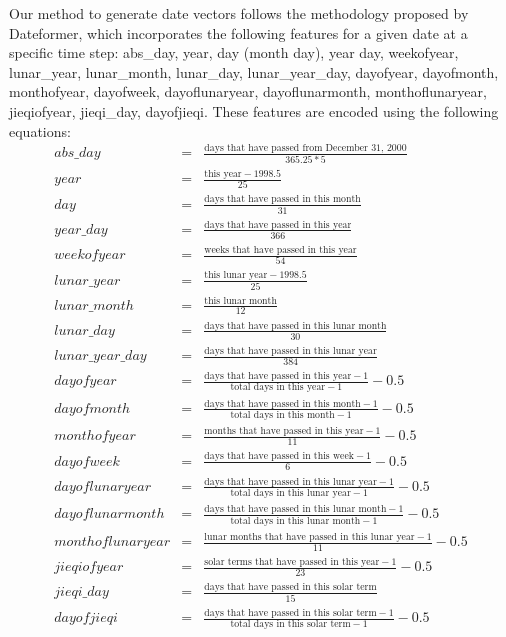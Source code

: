 \documentclass{article}
\begin{document}
Our method to generate date vectors follows the methodology proposed by Dateformer\cite{dateformer}, which incorporates the following features for a given date at a specific time step: abs\_day, year, day (month day), year day, weekofyear, lunar\_year, lunar\_month, lunar\_day, lunar\_year\_day, dayofyear, dayofmonth, monthofyear, dayofweek, dayoflunaryear, dayoflunarmonth, monthoflunaryear, jieqiofyear, jieqi\_day, dayofjieqi. These features are encoded using the following equations:
\begin{eqnarray}
    abs\_day &=& \frac{\text{days that have passed from December 31, 2000}}{365.25*5} \nonumber \\
    year &=& \frac{\text{this year} - 1998.5}{25} \nonumber \\
    day &=& \frac{\text{days that have passed in this month}}{31}\nonumber \\
    year\_day &=& \frac{\text{days that have passed in this year}}{366} \nonumber \\
    weekofyear&=& \frac{\text{weeks that have passed in this year}}{54} \nonumber \\
    lunar\_year&=& \frac{\text{this lunar year} - 1998.5}{25} \nonumber \\
    lunar\_month&=& \frac{\text{this lunar month}}{12} \nonumber \\
    lunar\_day&=& \frac{\text{days that have passed in this lunar month}}{30} \nonumber \\
    lunar\_year\_day&=& \frac{\text{days that have passed in this lunar year}}{384} \nonumber \\
     dayofyear&=& \frac{\text{days that have passed in this year} - 1}{\text{total days in this year} - 1}-0.5 \nonumber \\
     dayofmonth&=& \frac{\text{days that have passed in this month} - 1}{\text{total days in this month} - 1}-0.5 \nonumber \\
     monthofyear&=& \frac{\text{months that have passed in this year} - 1}{11}-0.5 \nonumber \\
     dayofweek&=& \frac{\text{days that have passed in this week} - 1}{6}-0.5 \nonumber \\
     dayoflunaryear&=& \frac{\text{days that have passed in this lunar year}-1}{\text{total days in this lunar year}-1}-0.5 \nonumber \\
     dayoflunarmonth&=& \frac{\text{days that have passed in this lunar month} - 1}{\text{total days in this lunar month} - 1}-0.5 \nonumber \\
     monthoflunaryear&=& \frac{\text{lunar months that have passed in this lunar year} - 1}{11}-0.5 \nonumber \\
     jieqiofyear&=& \frac{\text{solar terms that have passed in this year} - 1}{23}-0.5 \nonumber \\
     jieqi\_day&=& \frac{\text{days that have passed in this solar term}}{15}\nonumber \\
     dayofjieqi&=& \frac{\text{days that have passed in this solar term} - 1}{\text{total days in this solar term} - 1}-0.5\nonumber
    \end{eqnarray}
\end{document}
